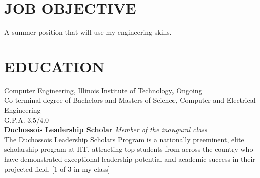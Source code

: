 \documentclass{res}
\begin{document}
 

\address{\bf  PRESENT ADDRESS\\Box 2256 \\3201 S. State St.\\Chicago, IL 60616\\(630) 450-5725}
\address{\bf PERMANENT ADDRESS \\2558 Breckeridge Ct.\\Aurora, IL 60504 \\  (630) 978-1952}
                                  
\begin{resume}

\section{JOB OBJECTIVE}          
    A summer position that will use my engineering skills.
 
\section{EDUCATION}          
    Computer Engineering, Illinois Institute of Technology, Ongoing\\
    Co-terminal degree of Bachelors and Masters of Science, Computer and Electrical Engineering\\       
    G.P.A. 3.5/4.0\\
    {\bf Duchossois Leadership Scholar} \emph{Member of the inaugural class}\\
  The Duchossois Leadership Scholars Program is a nationally preeminent, elite scholarship program at IIT, attracting top students from across the country who have demonstrated exceptional leadership potential and academic success in their projected field. [1 of 3 in my class]
 

\end{resume}
\end{document}
